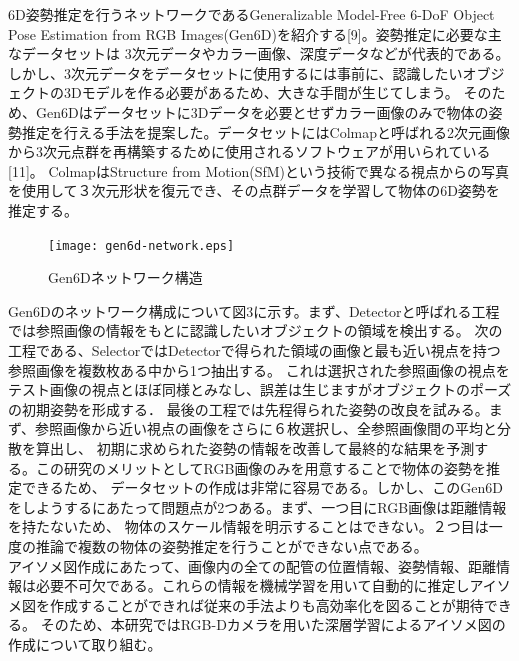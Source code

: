 6D姿勢推定を行うネットワークであるGeneralizable Model-Free 6-DoF Object Pose Estimation from RGB Images(Gen6D)を紹介する[9]。姿勢推定に必要な主なデータセットは
3次元データやカラー画像、深度データなどが代表的である。しかし、3次元データをデータセットに使用するには事前に、認識したいオブジェクトの3Dモデルを作る必要があるため、大きな手間が生じてしまう。
そのため、Gen6Dはデータセットに3Dデータを必要とせずカラー画像のみで物体の姿勢推定を行える手法を提案した。データセットにはColmapと呼ばれる2次元画像から3次元点群を再構築するために使用されるソフトウェアが用いられている[11]。
ColmapはStructure from Motion(SfM)という技術で異なる視点からの写真を使用して３次元形状を復元でき、その点群データを学習して物体の6D姿勢を推定する。\\
\begin{figure}[htbt]
	\centering
	 \texttt{[image: gen6d-network.eps]}
	 \caption{Gen6Dネットワーク構造}
	 \label{fig:f2}
\end{figure}

Gen6Dのネットワーク構成について図3に示す。まず、Detectorと呼ばれる工程では参照画像の情報をもとに認識したいオブジェクトの領域を検出する。
次の工程である、SelectorではDetectorで得られた領域の画像と最も近い視点を持つ参照画像を複数枚ある中から1つ抽出する。
これは選択された参照画像の視点をテスト画像の視点とほぼ同様とみなし、誤差は生じますがオブジェクトのポーズの初期姿勢を形成する．
最後の工程では先程得られた姿勢の改良を試みる。まず、参照画像から近い視点の画像をさらに６枚選択し、全参照画像間の平均と分散を算出し、
初期に求められた姿勢の情報を改善して最終的な結果を予測する。この研究のメリットとしてRGB画像のみを用意することで物体の姿勢を推定できるため、
データセットの作成は非常に容易である。しかし、このGen6Dをしようするにあたって問題点が2つある。まず、一つ目にRGB画像は距離情報を持たないため、
物体のスケール情報を明示することはできない。２つ目は一度の推論で複数の物体の姿勢推定を行うことができない点である。\\

アイソメ図作成にあたって、画像内の全ての配管の位置情報、姿勢情報、距離情報は必要不可欠である。これらの情報を機械学習を用いて自動的に推定しアイソメ図を作成することができれば従来の手法よりも高効率化を図ることが期待できる。
そのため、本研究ではRGB-Dカメラを用いた深層学習によるアイソメ図の作成について取り組む。

